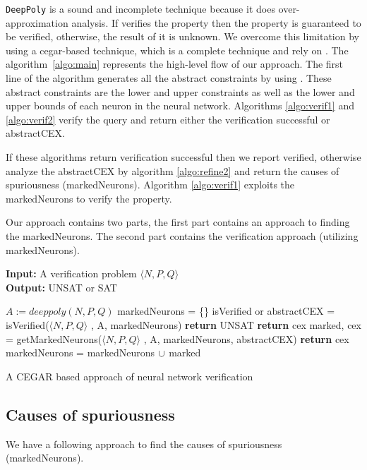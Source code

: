 \texttt{DeepPoly} is a sound and incomplete technique because it does over-approximation analysis. 
If \deeppoly{} verifies the property then the property is guaranteed to be verified, otherwise, the result of it is unknown. 
We overcome this limitation by using a cegar-based technique, which is a complete technique and rely on \deeppoly{}. 
The algorithm~\ref{algo:main} represents the high-level flow of our approach.
The first line of the algorithm generates all the abstract constraints by using \deeppoly{}. 
These abstract constraints are the lower and upper constraints as well as the lower and upper bounds 
of each neuron in the neural network. Algorithms \ref{algo:verif1} and \ref{algo:verif2} verify the query 
and return either the verification successful or abstractCEX. 

If these algorithms return verification successful then we report verified,
otherwise analyze the abstractCEX by algorithm \ref{algo:refine2} and return the causes of spuriousness (markedNeurons). 
Algorithm \ref{algo:verif1} exploits the markedNeurons to verify the property. 

Our approach contains two parts, the first part contains an approach to finding the markedNeurons. 
The second part contains the verification approach (utilizing markedNeurons).

\begin{algorithm}[t]
  \textbf{Input: } A verification problem $\langle N,P,Q \rangle$ \\
  \textbf{Output: } UNSAT or SAT
  \begin{algorithmic}[1]
    \State $A := deeppoly(N,P,Q)$
    \State markedNeurons = \{\}
      \State isVerified or abstractCEX = isVerified($\langle N,P,Q \rangle$ , A, markedNeurons)
        \State \textbf{return} UNSAT
      \Else
          \State \textbf{return} cex
        \Else
          \State marked, cex = getMarkedNeurons($\langle N,P,Q \rangle$ , A, markedNeurons, abstractCEX)
            \State \textbf{return} cex
          \EndIf
          \State markedNeurons = markedNeurons ${\cup}$ marked
        \EndIf
      \EndIf
    \EndWhile
  \end{algorithmic}
  \caption{A CEGAR based approach of neural network verification}
  \label{algo:main}
\end{algorithm}

\subsection{Causes of spuriousness} 
We have a following approach to find the causes of spuriousness (markedNeurons). 

